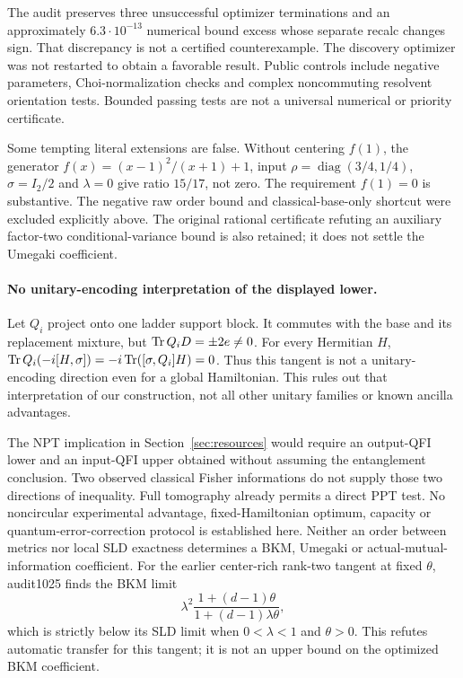 The audit preserves three unsuccessful optimizer terminations and an approximately \(6.3\cdot10^{-13}\) numerical bound excess whose separate recalc changes sign. That discrepancy is not a certified counterexample. The discovery optimizer was not restarted to obtain a favorable result. Public controls include negative parameters, Choi-normalization checks and complex noncommuting resolvent orientation tests. Bounded passing tests are not a universal numerical or priority certificate.

Some tempting literal extensions are false. Without centering \(f(1)\), the generator \(f(x)=(x-1)^2/(x+1)+1\), input \(\rho=\operatorname{diag}(3/4,1/4)\), \(\sigma=I_2/2\) and \(\lambda=0\) give ratio \(15/17\), not zero. The requirement \(f(1)=0\) is substantive. The negative raw order bound and classical-base-only shortcut were excluded explicitly above. The original rational certificate refuting an auxiliary factor-two conditional-variance bound is also retained; it does not settle the Umegaki coefficient.

\paragraph{No unitary-encoding interpretation of the displayed lower.}
Let \(Q_i\) project onto one ladder support block. It commutes with the base and its replacement mixture, but \(\operatorname{Tr} Q_iD=\pm2e\ne0\). For every Hermitian \(H\),
\(\operatorname{Tr} Q_i(-i[H,\sigma])=-i\operatorname{Tr}([\sigma,Q_i]H)=0\).
Thus this tangent is not a unitary-encoding direction even for a global Hamiltonian. This rules out that interpretation of our construction, not all other unitary families or known ancilla advantages.

The NPT implication in Section~\ref{sec:resources} would require an output-QFI lower and an input-QFI upper obtained without assuming the entanglement conclusion. Two observed classical Fisher informations do not supply those two directions of inequality. Full tomography already permits a direct PPT test. No noncircular experimental advantage, fixed-Hamiltonian optimum, capacity or quantum-error-correction protocol is established here. Neither an order between metrics nor local SLD exactness determines a BKM, Umegaki or actual-mutual-information coefficient. For the earlier center-rich rank-two tangent at fixed $\theta$, audit1025 finds the BKM limit
\[
 \lambda^2\frac{1+(d-1)\theta}{1+(d-1)\lambda\theta},
\]
which is strictly below its SLD limit when $0<\lambda<1$ and $\theta>0$. This refutes automatic transfer for this tangent; it is not an upper bound on the optimized BKM coefficient.

